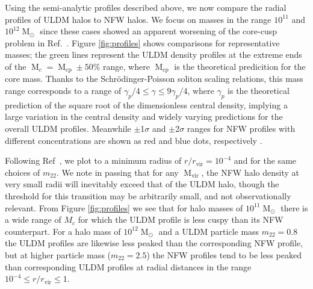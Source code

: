 \documentclass[a4paper,11pt]{article}
\begin{document}
 
Using the semi-analytic profiles described above, we now compare the radial profiles of ULDM halos to NFW halos. We focus on masses in the range $10^{11}$ and $10^{12} \operatorname{M}_{\odot}$ since these cases showed an apparent worsening of the core-cusp problem in Ref.~\cite{Robles:2018fur}. Figure \ref{fig:profiles} shows comparisons for representative masses; the green lines represent the ULDM density profiles at the extreme ends of the $\operatorname{M}_c = \operatorname{M}_{\mathrm{cp}} \pm 50 \% $ range, where $\operatorname{M}_{\mathrm{cp}}$ is the theoretical predicition for the core mass. Thanks to the  Schr{\"o}dinger-Poisson soliton scaling relations, this mass range corresponds to a range of $ \gamma_p /4 \leq \gamma \leq 9\gamma_p/4$, where $\gamma_p$ is the theoretical prediction of the square root of the dimensionless central density, implying a large variation in the central density and widely varying predictions for the overall ULDM profiles. Meanwhile $\pm$1$\sigma$ and $\pm$2$\sigma$ ranges for NFW profiles with different concentrations are shown as red and blue dots, respectively \cite{Maccio:2008pcd}. 

Following Ref~\cite{Robles:2018fur}, we plot to a minimum radius of $r/r_{\mathrm{vir}} = 10^{-4}$ and for the same choices of $m_{22}$. We note in passing that for any $\operatorname{M}_{\mathrm{vir}}$, the NFW halo density at very small radii will inevitably exceed that of the ULDM halo, though the threshold for this transition may be arbitrarily small, and not observationally relevant. From Figure \ref{fig:profiles} we see that for halo masses of $10^{11}\operatorname{M}_{\odot}$ there is a wide range of $M_c$ for which the ULDM profile is less cuspy than its NFW counterpart. For a halo mass of $10^{12}\operatorname{M}_{\odot}$ and a ULDM particle mass $m_{22}=0.8$ the ULDM profiles are likewise less peaked than the corresponding NFW profile, but at higher particle mass ($m_{22}=2.5$) the  NFW profiles tend to be less peaked than corresponding ULDM profiles at radial distances in  the range $10^{-4}\leq r/r_{\mathrm{vir}} \leq 1$.
\end{document}
